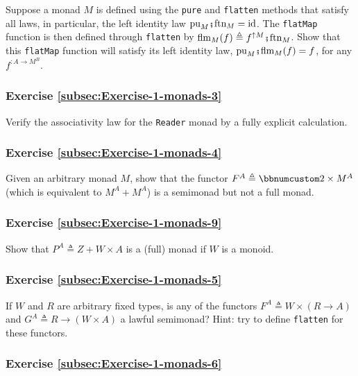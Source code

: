 Suppose a monad $M$ is defined using the \lstinline!pure! and \lstinline!flatten!
methods that satisfy all laws, in particular, the left identity law
$\text{pu}_{M}\bef\text{ftn}_{M}=\text{id}$. The \lstinline!flatMap!
function is then defined through \lstinline!flatten! by $\text{flm}_{M}(f)\triangleq f^{\uparrow M}\bef\text{ftn}_{M}$.
Show that this \lstinline!flatMap! function will satisfy its left
identity law, $\text{pu}_{M}\bef\text{flm}_{M}(f)=f$, for any $f^{:A\rightarrow M^{B}}$.

\subsubsection{Exercise \label{subsec:Exercise-1-monads-3}\ref{subsec:Exercise-1-monads-3}}

Verify the associativity law for the \lstinline!Reader! monad by
a fully explicit calculation.

\subsubsection{Exercise \label{subsec:Exercise-1-monads-4}\ref{subsec:Exercise-1-monads-4}}

Given an arbitrary monad $M$, show that the functor $F^{A}\triangleq\bbnum 2\times M^{A}$
(which is equivalent to $M^{A}+M^{A}$) is a semimonad but not a full
monad.

\subsubsection{Exercise \label{subsec:Exercise-1-monads-9}\ref{subsec:Exercise-1-monads-9}}

Show that $P^{A}\triangleq Z+W\times A$ is a (full) monad if $W$
is a monoid.

\subsubsection{Exercise \label{subsec:Exercise-1-monads-5}\ref{subsec:Exercise-1-monads-5}}

If $W$ and $R$ are arbitrary fixed types, is any of the functors
$F^{A}\triangleq W\times\left(R\rightarrow A\right)$ and $G^{A}\triangleq R\rightarrow\left(W\times A\right)$
a lawful semimonad? Hint: try to define \lstinline!flatten! for these
functors.

\subsubsection{Exercise \label{subsec:Exercise-1-monads-6}\ref{subsec:Exercise-1-monads-6}}

